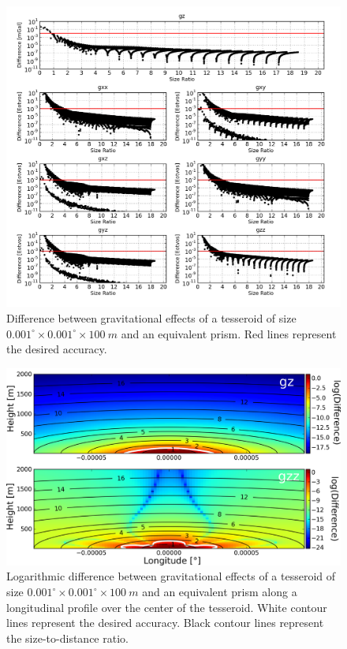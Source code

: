 \documentclass[a4paper,twocolumn]{esapub2005} %
\begin{document}
\begin{figure}[h]
    \centering
        \includegraphics[width=\textwidth]{../figures/comparison0_001.png}
    \caption{Difference between gravitational effects of a tesseroid of size
    $0.001^{\circ} \times 0.001^{\circ} \times 100\ m$ and an equivalent prism.
    Red lines represent the desired accuracy.
    \label{fig:res-0.001}}
\end{figure}
\begin{figure}[htb]
    \centering
        \includegraphics[width=\columnwidth]{../figures/comparion_profile_final.png}
    \caption{Logarithmic difference between gravitational effects of a tesseroid of
    size $0.001^{\circ} \times 0.001^{\circ} \times 100\ m$ and an equivalent prism
    along a longitudinal profile over the center of the tesseroid.
    White contour lines represent the desired accuracy. Black contour lines
    represent the size-to-distance ratio.
    \label{fig:res-0.001-profile}}
\end{figure}
\end{document}
